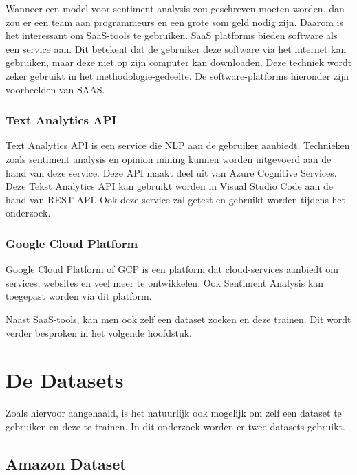 Wanneer een model voor sentiment analysis zou geschreven moeten worden, dan zou er een team aan programmeurs en een grote som geld nodig zijn. Daarom is het interessant om SaaS-tools te gebruiken. SaaS platforms bieden software als een service aan. Dit betekent dat de gebruiker deze software via het internet kan gebruiken, maar deze niet op zijn computer kan downloaden. \autocite{Marketing2021} Deze techniek wordt zeker gebruikt in het methodologie-gedeelte. De software-platforms hieronder zijn voorbeelden van \gls{SAAS}. 


\subsubsection{Text Analytics API}
\label{textanalytics}

Text Analytics API is een service die NLP aan de gebruiker aanbiedt. Technieken zoals sentiment analysis en opinion mining kunnen worden uitgevoerd aan de hand van deze service. Deze API maakt deel uit van Azure Cognitive Services. \autocite{Microsoft2020} Deze Tekst Analytics API kan gebruikt worden in Visual Studio Code aan de hand van REST API. Ook deze service zal getest en gebruikt worden tijdens het onderzoek.

\subsubsection{Google Cloud Platform}
\label{googlecloudplatform}
Google Cloud Platform of GCP is een platform dat cloud-services aanbiedt om services, websites en veel meer te ontwikkelen. Ook Sentiment Analysis kan toegepast worden via dit platform. \autocite{axxius2021}



Naast SaaS-tools, kan men ook zelf een dataset zoeken en deze trainen. Dit wordt verder besproken in het volgende hoofdstuk.

\section{De Datasets}
\label{datasets} 

Zoals hiervoor aangehaald, is het natuurlijk ook mogelijk om zelf een dataset te gebruiken en deze te trainen. In dit onderzoek worden er twee datasets gebruikt.

\subsection{Amazon Dataset}
\label{amazon}

